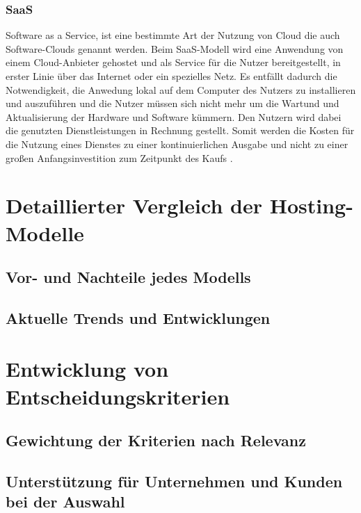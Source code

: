 \documentclass[12pt,bibtotoc]{article}
\begin{document}
		\newpage
		\subsubsection{SaaS}
		Software as a Service, ist eine bestimmte Art der Nutzung von Cloud die auch Software-Clouds genannt werden. 
		Beim SaaS-Modell wird eine Anwendung von einem Cloud-Anbieter gehostet und als Service für die Nutzer bereitgestellt, in erster Linie über das Internet oder ein spezielles Netz.
		Es entfällt dadurch die Notwendigkeit, die Anwedung lokal auf dem Computer des Nutzers zu installieren und auszuführen und die Nutzer müssen sich nicht mehr um die Wartund und Aktualisierung der Hardware und Software kümmern.
		Den Nutzern wird dabei die genutzten Dienstleistungen in Rechnung gestellt. Somit werden die Kosten für die Nutzung eines Dienstes zu einer kontinuierlichen Ausgabe und nicht zu einer großen Anfangsinvestition zum Zeitpunkt des Kaufs \cite{Murugesan.2016}.
		
	\section{Detaillierter Vergleich der Hosting-Modelle}
		\subsection{Vor- und Nachteile jedes Modells}
		\subsection{Aktuelle Trends und Entwicklungen}

	\section{Entwicklung von Entscheidungskriterien}
		\subsection{Gewichtung der Kriterien nach Relevanz}
		\subsection{Unterstützung für Unternehmen und Kunden bei der Auswahl}
\end{document}
